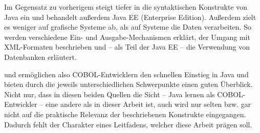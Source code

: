 Im Gegensatz zu vorherigem steigt  tiefer in die syntaktischen Konstrukte von Java ein und behandelt außerdem Java EE (Enterprise Edition). Außerdem zielt es weniger auf grafische Systeme ab, als auf Systeme die Daten verarbeiten. So werden verschiedene Ein- und Ausgabe-Mechanismen erklärt, der Umgang mit XML-Formaten beschrieben und -- als Teil der Java EE -- die Verwendung von Datenbanken erläutert.

 und  ermöglichen also COBOL-Entwicklern den schnellen Einstieg in Java und bieten durch die jeweils unterschiedlichen Schwerpunkte einen guten Überblick. Nicht nur, dass in diesen beiden Quellen die Sicht -- Java lernen als COBOL-Entwickler -- eine andere als in dieser Arbeit ist, auch wird nur selten bzw. gar nicht auf die praktische Relevanz der beschriebenen Konstrukte eingegangen. Dadurch fehlt der Charakter eines Leitfadens, welcher diese Arbeit prägen soll. 